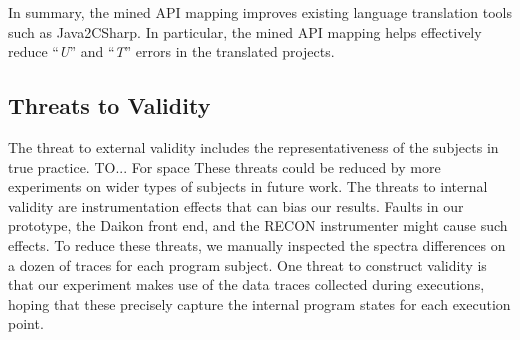 In summary, the mined API mapping improves existing language
translation tools such as Java2CSharp. In particular, the mined API
mapping helps effectively reduce ``\emph{U}'' and ``\emph{T}''
errors in the translated projects.


\subsection{Threats to Validity}
\label{sec:evaluation:threats} The threat to external validity
includes the representativeness of the subjects in true practice.
TO... For space These threats could be reduced by more experiments
on wider types of subjects in future work. The threats to internal
validity are instrumentation effects that can bias our results.
Faults in our prototype, the Daikon front end, and the RECON
instrumenter might cause such effects. To reduce these threats, we
manually inspected the spectra differences on a dozen of traces for
each program subject. One threat to construct validity is that our
experiment makes use of the data traces collected during executions,
hoping that these precisely capture the internal program states for
each execution point.
